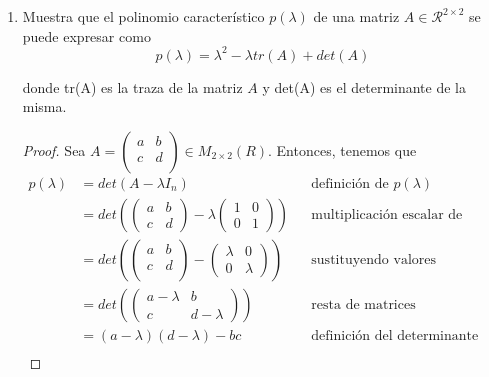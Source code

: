 \documentclass[letterpaper,11pt]{article}
\begin{document}
\begin{enumerate}
    \newpage
    \item Muestra que el polinomio característico $p(\lambda)$ de una matriz 
    $A \in \mathcal{R}^{2 \times 2}$ se puede expresar como 
    \begin{equation*}
        p(\lambda) = \lambda^2 - \lambda tr(A) + det(A)
    \end{equation*}

    donde tr(A) es la traza de la matriz $A$ y det(A) es el determinante de la 
    misma. 

    \begin{proof}
        Sea $A = \begin{pmatrix} a & b \\ c & d \\ \end{pmatrix} \in 
        M_{2 \times 2}(R)$. Entonces, tenemos que
        \begin{align*}
            p(\lambda) 
            &= det(A - \lambda I_n)
            && \text{definición de $p(\lambda)$} \\
            &= det \left( \begin{pmatrix} a & b \\ c & d \end{pmatrix} - 
                          \lambda \begin{pmatrix} 1 & 0 \\ 0 & 1 \end{pmatrix}
                   \right) 
            && \text{multiplicación escalar de matrices} \\
            &= det \left(\begin{pmatrix} a & b \\ c & d \\ \end{pmatrix} - 
                         \begin{pmatrix} \lambda & 0 \\ 0 & \lambda \end{pmatrix} 
                   \right)
            && \text{sustituyendo valores} \\
            &= det \left( \begin{pmatrix} a - \lambda & b \\ c & d -\lambda 
                          \end{pmatrix} \right)
            && \text{resta de matrices} \\
            &= (a - \lambda) (d - \lambda) - bc
            && \text{definición del determinante} \\ 

\end{align*}
\end{proof}
\end{enumerate}
\end{document}
